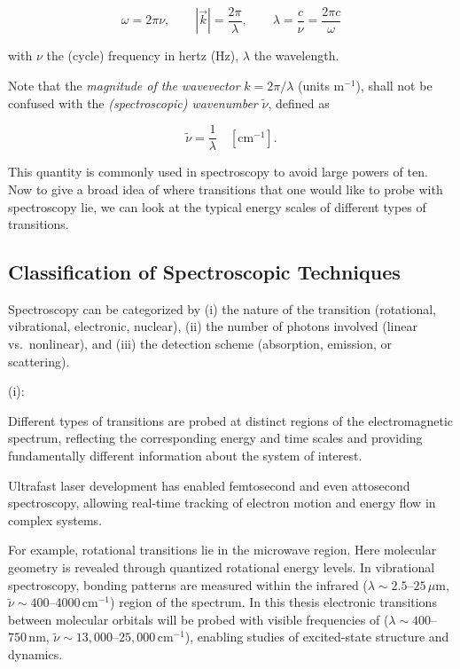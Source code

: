 \begin{equation}
	\omega = 2\pi\nu, \qquad |\vec{k}| = \frac{2\pi}{\lambda}, \qquad \lambda = \frac{c}{\nu} = \frac{2\pi c}{\omega}
	\label{eq:wavelength_frequency_relation}
\end{equation}

\noindent 
with $\nu$ the (cycle) frequency in hertz (Hz), $\lambda$ the wavelength. 

\noindent 
Note that the \emph{magnitude of the wavevector } $k = 2\pi/\lambda$ (units m$^{-1}$), shall not be confused with the \emph{(spectroscopic) wavenumber} $\tilde{\nu}$, defined as

\begin{equation}
	\tilde{\nu} = \frac{1}{\lambda} \quad [\mathrm{cm}^{-1}].
	\label{eq:wavenumber_definition}
\end{equation}

This quantity is commonly used in spectroscopy to avoid large powers of ten. 
Now to give a broad idea of where transitions that one would like to probe with spectroscopy lie, we can look at the typical energy scales of different types of transitions.

\subsection{Classification of Spectroscopic Techniques}

\noindent
Spectroscopy can be categorized by (i) the nature of the transition (rotational, vibrational, electronic, nuclear), (ii) the number of photons involved (linear vs.\ nonlinear), and (iii) the detection scheme (absorption, emission, or scattering). 

\noindent
(i):

\noindent
Different types of transitions are probed at distinct regions of the electromagnetic spectrum, reflecting the corresponding energy and time scales and providing fundamentally different information about the system of interest. 

\noindent
Ultrafast laser development has enabled femtosecond and even attosecond spectroscopy, allowing real-time tracking of electron motion and energy flow in complex systems.

\noindent
For example, rotational transitions lie in the microwave region. Here molecular geometry is revealed through quantized rotational energy levels. In vibrational spectroscopy, bonding patterns are measured within the infrared ($\lambda\!\sim\!2.5$–$25\,\mu\mathrm{m}$, $\tilde{\nu}\!\sim\!400$–$4000\,\mathrm{cm^{-1}}$) region of the spectrum. In this thesis electronic transitions between molecular orbitals will be probed with visible frequencies of  ($\lambda\!\sim\!400$–$750\,\mathrm{nm}$, $\tilde{\nu}\!\sim\!13{,}000$–$25{,}000\,\mathrm{cm^{-1}}$), enabling studies of excited-state structure and dynamics.

